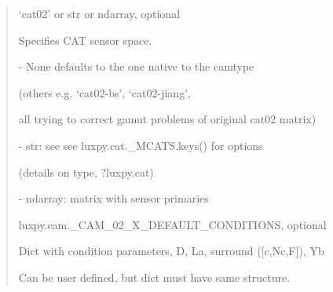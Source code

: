 \documentclass[letterpaper,10pt,english]{sphinxmanual}
\begin{document}
\begin{fulllineitems}
\begin{description}
\begin{quote}
\begin{description}
\item[{mcat}] \leavevmode
\begin{DUlineblock}{0em}
\item[] ‘cat02’ or str or ndarray, optional
\item[] Specifies CAT sensor space.
\item[]
\begin{DUlineblock}{\DUlineblockindent}
\item[] - None defaults to the one native to the camtype 
\item[]
\begin{DUlineblock}{\DUlineblockindent}
\item[] (others e.g. ‘cat02-bs’, ‘cat02-jiang’,
\item[] all trying to correct gamut problems of original cat02 matrix)
\end{DUlineblock}
\item[] - str: see see luxpy.cat.\_MCATS.keys() for options 
\item[]
\begin{DUlineblock}{\DUlineblockindent}
\item[] (details on type, ?luxpy.cat)
\end{DUlineblock}
\item[] - ndarray: matrix with sensor primaries
\end{DUlineblock}
\end{DUlineblock}

\item[{condition}] \leavevmode
\begin{DUlineblock}{0em}
\item[] luxpy.cam.\_CAM\_02\_X\_DEFAULT\_CONDITIONS, optional
\item[] Dict with condition parameters, D, La, surround ({[}c,Nc,F{]}), Yb
\item[] Can be user defined, but dict must have same structure.
\end{DUlineblock}


\end{description}
\end{quote}
\end{description}
\end{fulllineitems}
\end{document}
